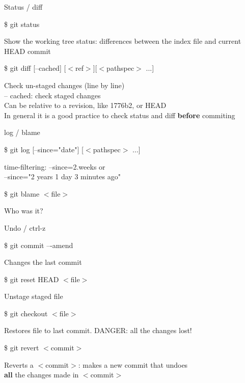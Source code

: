 \documentclass[10pt,xcolor=dvipsnames]{beamer}
\begin{document}
\begin{frame}{Status / diff }
\begin{block}{}
\$ git status 
\end{block}
Show the working tree status: differences between the index file and current HEAD commit\\[0.4in]
\begin{block}{}
\$ git diff [--cached] [$<$ref$>$][$<$pathspec$>$ ...]
\end{block}
Check un-staged changes (line by line)\\
-- cached: check staged changes\\
Can be relative to a revision, like 1776b2, or HEAD\\[0.4in]

In general it is a good practice to check status and diff {\bf before} commiting
\end{frame}

\begin{frame}{log / blame }
\begin{block}{}
\$ git log [--since="date"] [$<$pathspec$>$ ...]
\end{block}
time-filtering: --since=2.weeks or\\
--since="2 years 1 day 3 minutes ago"\\[0.4in]

\begin{block}{}
\$ git blame $<$file$>$ 
\end{block}
Who was it?
\end{frame}


\begin{frame}{Undo / ctrl-z}
\begin{block}{}
\$ git commit –-amend
\end{block}
Changes the last commit
\begin{block}{}
\$ git reset HEAD $<$file$>$
\end{block}
Unstage staged file
\begin{block}{}
\$ git checkout $<$file$>$
\end{block}
Restores file to last commit. DANGER: all the changes lost!
\begin{block}{}
\$ git revert $<$commit$>$
\end{block}
Reverts a $<$commit$>$: makes a new commit that undoes \\ {\bf all} the changes made in $<$commit$>$
\end{frame}
\end{document}
